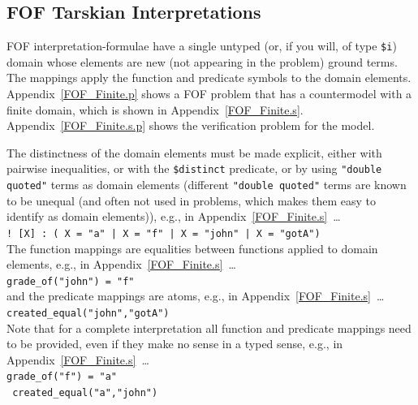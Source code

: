 \documentclass{easychair}
\newcommand{\smalltt}[1]{\small \texttt{#1}}
\begin{document}
\subsection{FOF Tarskian Interpretations}
\label{NewTarskianFOF}

FOF interpretation-formulae have a single untyped (or, if you will, of type {\tt \$i}) domain whose
elements are new (not appearing in the problem) ground terms. 
The mappings apply the function and predicate symbols to the domain elements.
Appendix~\ref{FOF_Finite.p} shows a FOF problem that has a countermodel with a finite domain, 
which is shown in Appendix~\ref{FOF_Finite.s}.
Appendix~\ref{FOF_Finite.s.p} shows the verification problem for the model.

The distinctness of the domain elements must be made explicit, either with pairwise inequalities, 
or with the {\tt \$distinct} predicate, or by using {\tt "double quoted"} terms as domain 
elements (different {\tt "double quoted"} terms are known to be unequal (and often not used in 
problems, which makes them easy to identify as domain elements)), e.g., in 
Appendix~\ref{FOF_Finite.s}~\ldots \\
\hspace*{0.5cm}\smalltt{! [X] : ( X = "a" | X = "f" | X = "john" | X = "gotA")} \\
The function mappings are equalities between functions applied to domain elements, e.g., in 
Appendix~\ref{FOF_Finite.s}~\ldots \\
\hspace*{0.5cm}\smalltt{grade\_of("john") = "f"}\\
and the predicate mappings are atoms, e.g., in Appendix~\ref{FOF_Finite.s}~\ldots \\
\hspace*{0.5cm}\smalltt{created\_equal("john","gotA")}\\
Note that for a complete interpretation all function and predicate mappings need to be provided,
even if they make no sense in a typed sense, e.g., in Appendix~\ref{FOF_Finite.s}~\ldots \\
\hspace*{0.5cm}\smalltt{grade\_of("f") = "a"}\\
\hspace*{0.5cm}\smalltt{{\raisebox{0.4ex}{\texttildelow}} created\_equal("a","john")}


\end{document}
